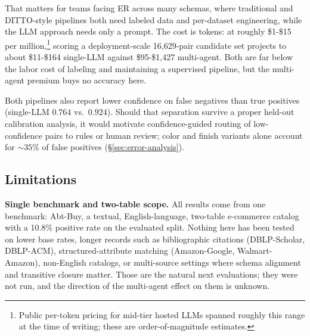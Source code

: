 \documentclass[sigconf]{acmart}
\begin{document}
That matters for teams facing ER across many schemas, where traditional and DITTO-style pipelines both need labeled data and per-dataset engineering, while the LLM approach needs only a prompt.
The cost is tokens: at roughly \$1-\$15 per million,\footnote{Public per-token pricing for mid-tier hosted LLMs spanned roughly this range at the time of writing; these are order-of-magnitude estimates.} scoring a deployment-scale 16,629-pair candidate set projects to about \$11-\$164 single-LLM against \$95-\$1,427 multi-agent.
Both are far below the labor cost of labeling and maintaining a supervised pipeline, but the multi-agent premium buys no accuracy here.

Both pipelines also report lower confidence on false negatives than true positives (single-LLM $0.764$ vs.\ $0.924$).
Should that separation survive a proper held-out calibration analysis, it would motivate confidence-guided routing of low-confidence pairs to rules or human review; color and finish variants alone account for ${\sim}35\%$ of false positives (\S\ref{sec:error-analysis}).

\subsection{Limitations}
\textbf{Single benchmark and two-table scope.} All results come from one benchmark: Abt-Buy, a textual, English-language, two-table e-commerce catalog with a 10.8\% positive rate on the evaluated split.
Nothing here has been tested on lower base rates, longer records such as bibliographic citations (DBLP-Scholar, DBLP-ACM), structured-attribute matching (Amazon-Google, Walmart-Amazon), non-English catalogs, or multi-source settings where schema alignment and transitive closure matter.
Those are the natural next evaluations; they were not run, and the direction of the multi-agent effect on them is unknown.
\end{document}
